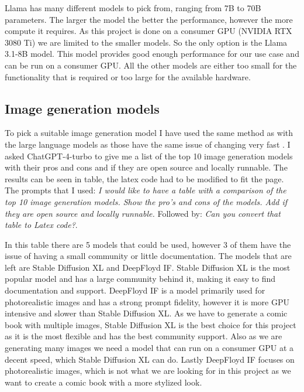 Llama has many different models to pick from, ranging from 7B to 70B parameters. The larger the model the better the performance, however the more compute it requires. As this project is done on a consumer GPU (NVIDIA RTX 3080 Ti) we are limited to the smaller models. So the only option is the Llama 3.1-8B model. This model provides good enough performance for our use case and can be run on a consumer GPU. All the other models are either too small for the functionality that is required or too large for the available hardware.

\subsection{Image generation models} 
To pick a suitable image generation model I have used the same method as with the large language models as those have the same issue of changing very fast \cite{bie2024renaissance}. I asked ChatGPT-4-turbo to give me a list of the top 10 image generation models with their pros and cons and if they are open source and locally runnable. The results can be seen in table, the latex code had to be modified to fit the page. The prompts that I used: \textit{I would like to have a table with a comparison of the top 10 image generation
models. Show the pro's and cons of the models. Add if they are open source and locally runnable.} Followed by: \textit{Can you convert that table to Latex code?}.

In this table there are 5 models that could be used, however 3 of them have the issue of having a small community or little documentation. The models that are left are Stable Diffusion XL and DeepFloyd IF. Stable Diffusion XL is the most popular model and has a large community behind it, making it easy to find documentation and support. DeepFloyd IF is a model primarily used for photorealistic images and has a strong prompt fidelity, however it is more GPU intensive and slower than Stable Diffusion XL. As we have to generate a comic book with multiple images, Stable Diffusion XL is the best choice for this project as it is the most flexible and has the best community support. Also as we are generating many images we need a model that can run on a consumer GPU at a decent speed, which Stable Diffusion XL can do. Lastly DeepFloyd IF focuses on photorealistic images, which is not what we are looking for in this project as we want to create a comic book with a more stylized look.

